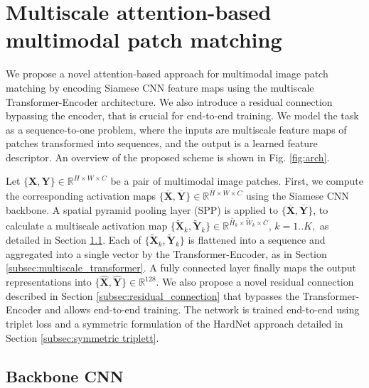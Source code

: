 \documentclass[10pt,journal]{IEEEtran}\usepackage{amsfonts}
\begin{document}
\section{Multiscale attention-based multimodal patch matching}

We propose a novel attention-based approach for multimodal image patch
matching by encoding Siamese CNN feature maps using the multiscale
Transformer-Encoder architecture. We also introduce a residual connection
bypassing the encoder, that is crucial for end-to-end training. We model the
task as a sequence-to-one problem, where the inputs are multiscale feature
maps of patches transformed into sequences, and the output is a learned
feature descriptor. An overview of the proposed scheme is shown in Fig. \ref {fig:arch}.

Let $\{\mathbf{X},\mathbf{Y}\}\in
\mathbb{R}
^{H\times W\times C}$ be a pair of multimodal image patches. First, we
compute the corresponding activation maps $\{\overline{\mathbf{X}},\overline{\mathbf{Y}}\}\in \mathbb{R}^{\overline{H}\times \overline{W}\times \overline{C}}$ using the Siamese CNN backbone. A spatial pyramid pooling layer (SPP)
\cite{SPP} is applied to $\{\overline{\mathbf{X}},\overline{\mathbf{Y}}\}$,
to calculate a multiscale activation map $\{\mathbf{\widetilde{X}}_{k},\mathbf{\widetilde{Y}}_{k}\}\in \mathbb{R}^{\widetilde{H_{k}}\times
\widetilde{W}_{k}\times \overline{C}}$, $k=1..K,$ as detailed in Section \ref {subsec:backbone}. Each of $\{\mathbf{\widetilde{X}}_{k},\mathbf{\widetilde{Y}}_{k}\}$ is flattened into a sequence and aggregated into a single vector
by the Transformer-Encoder, as in Section \ref{subsec:multiscale_transformer}. A fully connected layer finally maps the output representations into $\{\mathbf{\widehat{X}},\mathbf{\widehat{Y}}\}\in
\mathbb{R}
^{128}$. We also propose a novel residual connection described in Section \ref{subsec:residual_connection} that bypasses the Transformer-Encoder and
allows end-to-end training. The network is trained end-to-end using triplet
loss \cite{FaceNetTripletLoss} and a symmetric formulation of the HardNet
approach \cite{HardNet} detailed in Section \ref{subsec:symmetric triplett}.

\subsection{Backbone CNN}

\label{subsec:backbone}
\end{document}
